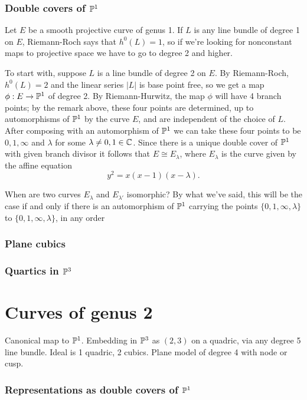 \subsubsection{Double covers of $\PP^1$}

Let $E$ be a smooth projective curve of genus 1. If $L$ is any line bundle of degree 1 on $E$, Riemann-Roch says that $h^0(L) = 1$, so if we're looking for nonconstant maps to projective space we have to go to degree 2 and higher.

To start with, suppose $L$ is a line bundle of degree 2 on $E$. By Riemann-Roch, $h^0(L) = 2$ and the linear series $|L|$ is base point free, so we get a map $\phi : E \to \PP^1$ of degree 2. By Riemann-Hurwitz, the map $\phi$ will have 4 branch points; by the remark above, these four points are determined, up to automorphisms of $\PP^1$ by the curve $E$, and are independent of the choice of $L$.
After composing with an automorphism of $\PP^1$ we can take these four points to be $0, 1, \infty$ and $\lambda$ for some $\lambda \neq 0, 1 \in \CC$. Since there is a unique double cover of $\PP^1$ with given branch divisor  it follows that $E \cong E_\lambda$, where $E_\lambda$ is the curve given by the affine equation
$$
y^2 = x(x-1)(x-\lambda).
$$

When are two curves $E_\lambda$ and $E_{\lambda'}$ isomorphic? By what we've said, this will be the case if and only if there is an automorphism of $\PP^1$ carrying the points $\{0,1,\infty,\lambda\}$ to $\{0,1,\infty,\lambda\}$, in any order

\subsubsection{Plane cubics}

\subsubsection{Quartics in $\PP^3$}

\section{Curves of genus 2}

Canonical map to $\PP^1$. Embedding in $\PP^3$ as $(2,3)$ on a quadric, via any degree 5 line bundle. Ideal is 1 quadric, 2 cubics.
Plane model of degree 4 with node or cusp.

\subsubsection{Representations as double covers of $\PP^1$}

